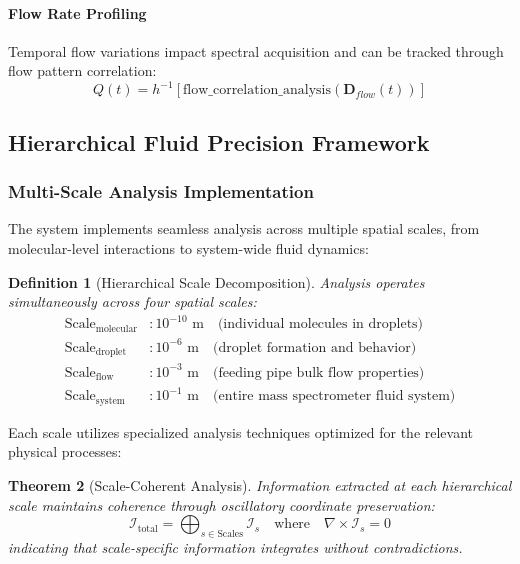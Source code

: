 \documentclass[11pt,a4paper]{article}
\newtheorem{theorem}{Theorem}[section]
\newtheorem{definition}[theorem]{Definition}
\theoremstyle{remark}
\begin{document}
\paragraph{Flow Rate Profiling} Temporal flow variations impact spectral acquisition and can be tracked through flow pattern correlation:
\begin{equation}
Q(t) = h^{-1}[\text{flow\_correlation\_analysis}(\mathbf{D}_{flow}(t))]
\end{equation}

\subsection{Hierarchical Fluid Precision Framework}

\subsubsection{Multi-Scale Analysis Implementation}

The system implements seamless analysis across multiple spatial scales, from molecular-level interactions to system-wide fluid dynamics:

\begin{definition}[Hierarchical Scale Decomposition]
Analysis operates simultaneously across four spatial scales:
\begin{align}
\text{Scale}_{\text{molecular}} &: 10^{-10} \text{ m} \quad \text{(individual molecules in droplets)}\\
\text{Scale}_{\text{droplet}} &: 10^{-6} \text{ m} \quad \text{(droplet formation and behavior)}\\
\text{Scale}_{\text{flow}} &: 10^{-3} \text{ m} \quad \text{(feeding pipe bulk flow properties)}\\
\text{Scale}_{\text{system}} &: 10^{-1} \text{ m} \quad \text{(entire mass spectrometer fluid system)}
\end{align}
\end{definition}

Each scale utilizes specialized analysis techniques optimized for the relevant physical processes:

\begin{theorem}[Scale-Coherent Analysis]
Information extracted at each hierarchical scale maintains coherence through oscillatory coordinate preservation:
\begin{equation}
\mathcal{I}_{\text{total}} = \bigoplus_{s \in \text{Scales}} \mathcal{I}_s \quad \text{where} \quad \nabla \times \mathcal{I}_s = 0
\end{equation}
indicating that scale-specific information integrates without contradictions.
\end{theorem}
\end{document}
